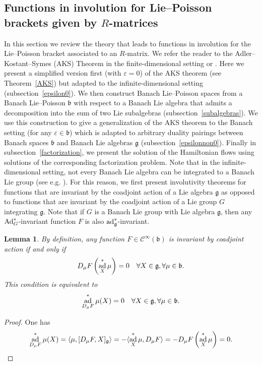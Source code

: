 \documentclass[a4paper,12pt,reqno]{amsart}%
\newtheorem{lemma}[theorem]{Lemma}
\theoremstyle{definition}
\theoremstyle{remark}
\numberwithin{theorem}{section}
\numberwithin{equation}{section}
\newcommand{\1}{{\bf 1}}
\DeclareMathOperator{\ad}{\textnormal{ad}}
\DeclareMathOperator{\Ad}{\textnormal{Ad}}
\newcommand{\Cp}{\mathscr{C}}
\newcommand{\g}{{\mathfrak g}}
\newcommand{\bg}{{\mathfrak b}}
\begin{document}
\subsection{Functions in involution for Lie--Poisson brackets given by \texorpdfstring{$R$}{R}-matrices}\label{sec:Involutivity}



In this section we review the theory that leads to functions in involution for the Lie--Poisson bracket associated to an $R$-matrix. We refer the reader to the Adler--Kostant--Symes (AKS) Theorem in the finite-dimensional setting \cite[Chapter~4.4]{adler} or \cite[Chapter~12.2]{laurent-gengoux}. Here we present a simplified version first (with $\varepsilon = 0$) of the AKS theorem (see Theorem~\ref{AKS}) but adapted to the infinite-dimensional setting (subsection~\ref{epsilon0}). We then construct Banach Lie--Poisson spaces from a Banach Lie--Poisson $\bg$ with respect to a Banach Lie algebra that admits a decomposition into  the sum of two Lie subalgebras (subsection~\ref{subalgebras}). We use this construction to give a generalization of the AKS theorem to the Banach setting (for any $\varepsilon\in\bg$) which is adapted to arbitrary duality pairings between  Banach spaces $\bg$ and  Banach Lie algebras $\g$ (subsection~\ref{epsilonnon0}). Finally in subsection~\ref{factorization}, we present the solution of the Hamiltonian flows using solutions of the corresponding factorization problem.
Note that in the infinite-dimensional setting, not every Banach Lie algebra can be integrated to a Banach Lie group (see e.g. \cite{vanest64,glockner-neeb03,beltita-pelletier2025}).
For this reason, we first present involutivity theorems for functions that are invariant by the coadjoint action of a Lie algebra $\g$ as opposed to functions that are invariant by the coadjoint action of a Lie group $G$ integrating $\g$. Note that if $G$ is a Banach Lie group with Lie algebra $\g$, then any $\Ad^*_G$-invariant function $F$ is also $\ad^*_\g$-invariant.

\begin{lemma}\label{adstar}
    By definition, any function $F\in \Cp^\infty(\bg)$ is invariant by coadjoint action if and only if
\begin{equation}\label{coadjinv}
    D_\mu F\left(\ad^*_X\mu\right) = 0  \quad \forall X\in\g, \forall \mu \in \bg.
    \end{equation}
    This condition is equivalent to
    \begin{equation}\label{hinv}
    \ad^*_{D_\mu F}\mu (X) =  0\quad \forall X\in\g, \forall \mu \in \bg.
    \end{equation}
\end{lemma}
\begin{proof}
One has
\[
     \ad^*_{D_\mu F}\mu (X) = \langle \mu, [D_\mu F, X]_\g\rangle = -\langle \ad^*_X \mu, D_\mu F\rangle = - D_\mu F\left(\ad^*_X \mu\right) = 0.
     \]
\end{proof}
\end{document}
